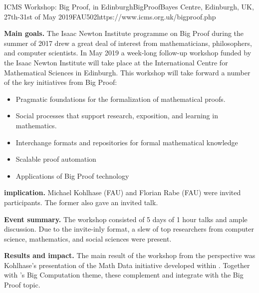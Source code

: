 \begin{event}{ICMS Workshop: Big Proof, in Edinburgh}{BigProof}{Bayes Centre, Edinburgh, UK, 27th-31st of May 2019}{FAU}{50}{2}{https://www.icms.org.uk/bigproof.php}

\textbf{Main goals.}
The Isaac Newton Institute programme on Big Proof during the summer of 2017 drew a great deal of interest from mathematicians, philosophers, and computer scientists.  In May 2019 a week-long follow-up workshop funded by the Isaac Newton Institute will take place at the International Centre for Mathematical Sciences in Edinburgh. This workshop will take forward a number of the key initiatives from Big Proof:

\begin{itemize}
\item Pragmatic foundations for the formalization of mathematical proofs.
\item Social processes that support research, exposition, and learning in mathematics.
\item Interchange formats and repositories for formal mathematical knowledge
\item Scalable proof automation
\item Applications of Big Proof technology
\end{itemize}

\textbf{\ODK implication.}
Michael Kohlhase (FAU) and Florian Rabe (FAU) were invited participants. The former also gave an invited talk.

\textbf{Event summary.}
The workshop consisted of 5 days of 1 hour talks and ample discussion.
Due to the invite-inly format, a slew of top researchers from computer science, mathematics, and social sciences were present.

\textbf{Results and impact.}
The main result of the workshop from the \ODK perspective was Kohlhase's presentation of the Math Data initiative developed within \ODK.
Together with \ODK's Big Computation theme, these complement and integrate with the Big Proof topic.
\end{event}
